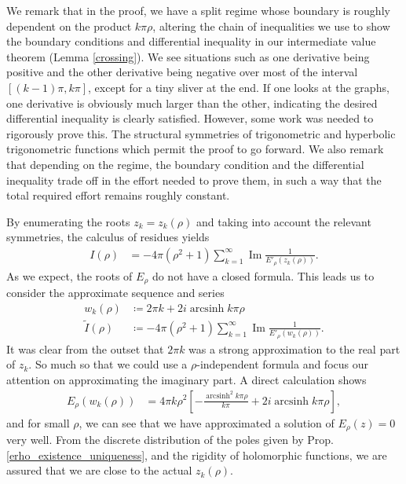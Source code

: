 \documentclass{amsart}
\theoremstyle{plain}
\numberwithin{theorem}{section}
\DeclareMathOperator{\arcsinh}{arcsinh}
\DeclareMathOperator{\Imz}{Im}
\theoremstyle{definition}
\theoremstyle{remark}
\theoremstyle{brakets}
\begin{document}
We remark that in the proof, we have a split regime whose boundary is roughly dependent on the product $k\pi\rho$, altering the chain of inequalities we use to show the boundary conditions and differential inequality in our intermediate value theorem (Lemma \ref{crossing}). We see situations such as one derivative being positive and the other derivative being negative over most of the interval $[(k-1)\pi,k\pi]$, except for a tiny sliver at the end. If one looks at the graphs, one derivative is obviously much larger than the other, indicating the desired differential inequality is clearly satisfied. However, some work was needed to rigorously prove this. The structural symmetries of trigonometric and hyperbolic trigonometric functions which permit the proof to go forward. We also remark that depending on the regime, the boundary condition and the differential inequality trade off in the effort needed to prove them, in such a way that the total required effort remains roughly constant.

By enumerating the roots $z_k = z_k(\rho)$ and taking into account the relevant symmetries, the calculus of residues yields
\begin{align*}
    I(\rho) &= -4\pi (\rho^2 + 1) \sum\limits_{k=1}^\infty \Imz \frac{1}{E'_\rho(z_k(\rho))}.
\end{align*}
As we expect, the roots of $E_\rho$ do not have a closed formula. This leads us to consider the approximate sequence and series
\begin{align*}
    w_k(\rho) &\coloneq 2\pi k + 2 i \arcsinh k\pi\rho \\
    \tilde{I}(\rho) &\coloneq -4\pi (\rho^2  +1) \sum\limits_{k=1}^\infty \Imz \frac{1}{E'_\rho(w_k(\rho))}.
\end{align*}
It was clear from the outset that $2\pi k$ was a strong approximation to the real part of $z_k$. So much so that we could use a $\rho$-independent formula and focus our attention on approximating the imaginary part. A direct calculation shows
\begin{align*}
    E_\rho(w_k(\rho)) &= 4\pi k \rho^2\left[ -\frac{\arcsinh^2 k\pi\rho}{k\pi} + 2i\arcsinh k\pi\rho\right],
\end{align*}
and for small $\rho$, we can see that we have approximated a solution of $E_\rho(z) = 0$ very well. From the discrete distribution of the poles given by Prop. \ref{erho_existence_uniqueness}, and the rigidity of holomorphic functions, we are assured that we are close to the actual $z_k(\rho)$.
\end{document}
